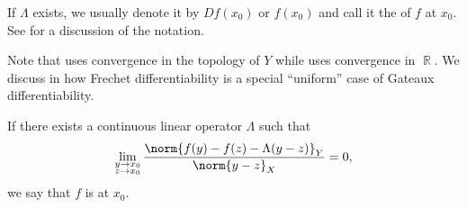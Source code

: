 \begin{definition}
\begin{thmenum}
    If \( \Lambda \) exists, we usually denote it by \( D f(x_0) \) or \( f(x_0) \) and call it the  of \( f \) at \( x_0 \). See  for a discussion of the notation.

    Note that  uses convergence in the topology of \( Y \) while  uses convergence in \( \BbbR \). We discuss in  how Frechet differentiability is a special \enquote{uniform} case of Gateaux differentiability.

    If there exists a continuous linear operator \( \Lambda \) such that
    \begin{equation}\label{def:differentiability/strict/condition}
      \lim_{\substack{y \to x_0 \\ z \to x_0}} \frac {\norm{f(y) - f(z) - \Lambda (y - z)}_Y} {\norm{y - z}_X} = 0,
    \end{equation}
    we say that \( f \) is  at \( x_0 \).
  \end{thmenum}
\end{definition}

